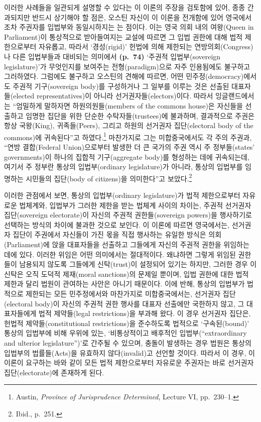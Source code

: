 이러한 사례들을 일관되게 설명할 수 있다는 이 이론의 주장을 검토함에
있어, 종종 간과되지만 반드시 상기해야 할 점은, 오스틴 자신이 이 이론을
전개함에 있어 영국에서조차 주권자를 입법부와 동일시하지는
는 점이다. 이는 영국 의회 내의 여왕(Queen in
Parliament)이 통상적으로 받아들여지는 교설에 따르면 그 입법 권한에 대해
법적 제한으로부터 자유롭고, 따라서 ‘경성(rigid)’ 헌법에 의해 제한되는
연방의회(Congress)나 다른 입법부들과 대비되는 의미에서 \textbf{(p.~74)}
‘주권적 입법부(sovereign legislature)’가 무엇인지를 보여주는
전형(paradigm)으로 자주 인용됨에도 불구하고 그러하였다. 그럼에도
불구하고 오스틴의 견해에 따르면, 어떤 민주정(democracy)에서도 주권적
기구(sovereign body)를 구성하거나 그 일부를 이루는 것은 선출된
대표자들(elected representatives)이 아니라 선거권자들(electors)이다.
따라서 잉글랜드에서는 “엄밀하게 말하자면 하원의원들(members of the
commons house)은 자신들을 선출하고 임명한 집단을 위한 단순한
수탁자들(trustees)에 불과하며, 결과적으로 주권은 항상 국왕(King),
귀족들(Peers), 그리고 하원의 선거권자 집단(electoral body of the
commons)에 귀속된다”고 하였다.\footnote{Austin, \emph{Province of
  Jurisprudence Determined}, Lecture VI, pp.~230--1.} 마찬가지로 그는
미합중국에서도 각 주의 주권과, “연방 결합(Federal Union)으로부터 발생한
더 큰 국가의 주권 역시 주 정부들(states' governments)이 하나의 집합적
기구(aggregate body)를 형성하는 데에 귀속되는데, 여기서 주 정부란 통상의
입법부(ordinary legislature)가 아니라, 통상의 입법부를 임명하는 시민들의
집단(body of citizens)을 의미한다”고 보았다.\footnote{Ibid., p.~251.}

이러한 관점에서 보면, 통상의 입법부(ordinary legislature)가 법적
제한으로부터 자유로운 법체계와, 입법부가 그러한 제한을 받는 법체계
사이의 차이는, 주권적 선거권자 집단(sovereign electorate)이 자신의
주권적 권한들(sovereign powers)을 행사하기로 선택하는 방식의 차이에
불과한 것으로 보인다. 이 이론에 따르면 영국에서는, 선거권자 집단이
주권에서 자신들이 가진 몫을 직접 행사하는 유일한 방식은
의회(Parliament)에 앉을 대표자들을 선출하고 그들에게 자신의 주권적
권한을 위임하는 데에 있다. 이러한 위임은 어떤 의미에서는 절대적이다.
왜냐하면 그렇게 위임된 권한들이 남용되지 않도록 그들에게 신탁(trust)이
설정되어 있기는 하지만, 그러한 경우 이 신탁은 오직 도덕적 제재(moral
sanctions)의 문제일 뿐이며, 입법 권한에 대한 법적 제한과 달리 법원이
관여하는 사안은 아니기 때문이다. 이에 반해, 통상의 입법부가 법적으로
제한되는 모든 민주정에서와 마찬가지로 미합중국에서는, 선거권자
집단(electoral body)이 자신의 주권적 권한 행사를 대표자 선출에만
국한하지 않고, 그 대표자들에게 법적 제약들(legal restrictions)을 부과해
왔다. 이 경우 선거권자 집단은, 헌법적 제약들(constitutional
restrictions)을 준수하도록 법적으로 ‘구속된(bound)’ 통상의 입법부에 비해
우위에 있는, ‘비통상적이고 배후적인 입법부(“extraordinary and ulterior
legislature”)’로 간주될 수 있으며, 충돌이 발생하는 경우 법원은 통상의
입법부의 법률들(Acts)을 유효하지 않다(invalid)고 선언할 것이다. 따라서
이 경우, 이 이론이 요구하는 바와 같이 모든 법적 제한으로부터 자유로운
주권자는 바로 선거권자 집단(electorate)에 존재하게 된다.

